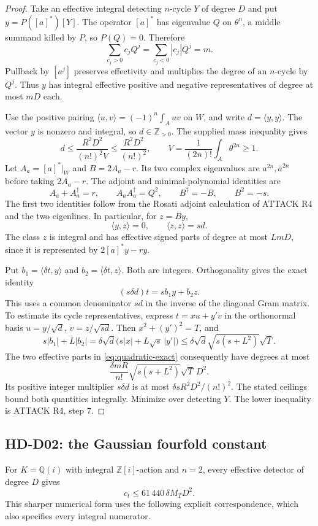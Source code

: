 \begin{proof}
Take an effective integral detecting $n$-cycle $Y$ of degree $D$ and put $y=P([a]^*)[Y]$. The operator $[a]^*$ has eigenvalue $Q$ on $\theta^n$, a middle summand killed by $P$, so $P(Q)=0$. Therefore
\[
 \sum_{c_j>0}c_jQ^j=\sum_{c_j<0}|c_j|Q^j=m.
\]
Pullback by $[a^j]$ preserves effectivity and multiplies the degree of an $n$-cycle by $Q^j$. Thus $y$ has integral effective positive and negative representatives of degree at most $mD$ each.

Use the positive pairing $\langle u,v\rangle=(-1)^n\int_Auv$ on $W$, and write $d=\langle y,y\rangle$. The vector $y$ is nonzero and integral, so $d\in\mathbb Z_{>0}$. The supplied mass inequality gives
\[
 d\le \frac{R^2D^2}{(n!)^2 V}\le\frac{R^2D^2}{(n!)^2},
 \qquad V=\frac1{(2n)!}\int_A\theta^{2n}\ge1.
\]
Let $A_a=[a]^*|_W$ and $B=2A_a-r$. Its two complex eigenvalues are $a^{2n},\bar a^{2n}$ before taking $2A_a-r$. The adjoint and minimal-polynomial identities are
\[
 A_a+A_a^\dagger=r,\qquad A_aA_a^\dagger=Q^2,
 \qquad B^\dagger=-B,\qquad B^2=-s.
\]
The first two identities follow from the Rosati adjoint calculation of ATTACK R4 and the two eigenlines. In particular, for $z=By$,
\[
 \langle y,z\rangle=0,\qquad\langle z,z\rangle=sd.
\]
The class $z$ is integral and has effective signed parts of degree at most $LmD$, since it is represented by $2[a]^*y-r y$.

Put $b_1=\langle\delta t,y\rangle$ and $b_2=\langle\delta t,z\rangle$. Both are integers. Orthogonality gives the exact identity
\begin{equation}\label{eq:quadratic-exact}
 (s\delta d)t=s b_1y+b_2z.
\end{equation}
This uses a common denominator $sd$ in the inverse of the diagonal Gram matrix. To estimate its cycle representatives, express $t=xu+y'v$ in the orthonormal basis $u=y/\sqrt d$, $v=z/\sqrt{sd}$. Then $x^2+(y')^2=T$, and
\[
 s|b_1|+L|b_2|
 =\delta\sqrt d\bigl(s|x|+L\sqrt s\,|y'|\bigr)
 \le\delta\sqrt d\sqrt{s(s+L^2)}\sqrt T.
\]
The two effective parts in \eqref{eq:quadratic-exact} consequently have degrees at most
\[
 \frac{\delta mR}{n!}\sqrt{s(s+L^2)}\sqrt T\,D^2.
\]
Its positive integer multiplier $s\delta d$ is at most $\delta sR^2D^2/(n!)^2$. The stated ceilings bound both quantities integrally. Minimize over detecting $Y$. The lower inequality is ATTACK R4, step 7.
\end{proof}

\subsection{HD-D02: the Gaussian fourfold constant}
For $K=\mathbb Q(i)$ with integral $\mathbb Z[i]$-action and $n=2$, every effective detector of degree $D$ gives
\begin{equation}\label{eq:gaussian-quadratic}
 c_t\le61\,440\,\delta M_T D^2.
\end{equation}
This sharper numerical form uses the following explicit correspondence, which also specifies every integral numerator.

